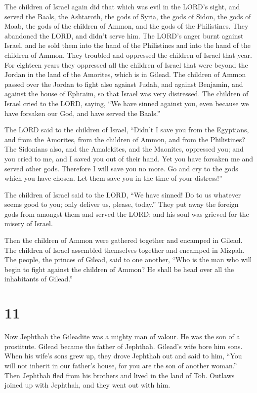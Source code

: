  The children of Israel again did that which was evil in the
LORD's sight, and served the Baals, the Ashtaroth, the gods of Syria,
the gods of Sidon, the gods of Moab, the gods of the children of Ammon,
and the gods of the Philistines. They abandoned the LORD, and didn't
serve him.  The LORD's anger burnt against Israel, and he
sold them into the hand of the Philistines and into the hand of the
children of Ammon.  They troubled and oppressed the children
of Israel that year. For eighteen years they oppressed all the children
of Israel that were beyond the Jordan in the land of the Amorites, which
is in Gilead.  The children of Ammon passed over the Jordan
to fight also against Judah, and against Benjamin, and against the house
of Ephraim, so that Israel was very distressed.  The
children of Israel cried to the LORD, saying, ``We have sinned against
you, even because we have forsaken our God, and have served the Baals.''

 The LORD said to the children of Israel, ``Didn't I save
you from the Egyptians, and from the Amorites, from the children of
Ammon, and from the Philistines?  The Sidonians also, and
the Amalekites, and the Maonites, oppressed you; and you cried to me,
and I saved you out of their hand.  Yet you have forsaken
me and served other gods. Therefore I will save you no more.
 Go and cry to the gods which you have chosen. Let them
save you in the time of your distress!''

 The children of Israel said to the LORD, ``We have sinned!
Do to us whatever seems good to you; only deliver us, please, today.''
 They put away the foreign gods from amongst them and
served the LORD; and his soul was grieved for the misery of Israel.

 Then the children of Ammon were gathered together and
encamped in Gilead. The children of Israel assembled themselves together
and encamped in Mizpah.  The people, the princes of Gilead,
said to one another, ``Who is the man who will begin to fight against
the children of Ammon? He shall be head over all the inhabitants of
Gilead.''

\hypertarget{section-10}{%
\section{11}\label{section-10}}

 Now Jephthah the Gileadite was a mighty man of valour. He
was the son of a prostitute. Gilead became the father of Jephthah.
 Gilead's wife bore him sons. When his wife's sons grew up,
they drove Jephthah out and said to him, ``You will not inherit in our
father's house, for you are the son of another woman.'' 
Then Jephthah fled from his brothers and lived in the land of Tob.
Outlaws joined up with Jephthah, and they went out with him.

